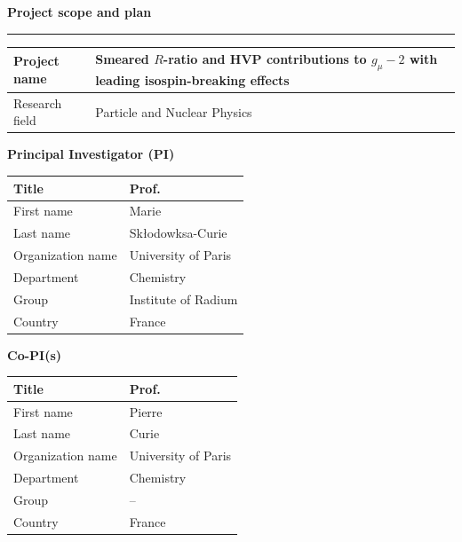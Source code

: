 \documentclass[a4paper,12pt]{article}
\begin{document}
{\fontsize{20}{24} \selectfont\textbf{Project scope and plan}}
{\color{orng}\hrule height 1pt}

\vspace*{0.15in}

\begin{xltabular}{\linewidth}{|>{}l|>{}X|}
  \hline
  \textbf{Project name} & Smeared $R$-ratio and HVP contributions to $g_\mu\!\!-2$ with leading isospin-breaking effects \\
  \hline
  Research field  & Particle and Nuclear Physics\\
  \hline
\end{xltabular}

\vspace{4pt}

\textbf{Principal Investigator (PI)}
\begin{xltabular}{\linewidth}{|>{}l|>{}X|}
  \hline
  Title & Prof. \\
  \hline
  First name  & Marie  \\
  \hline
  Last name  & Sk{\l}odowksa-Curie \\
  \hline
  Organization name  &  University of Paris \\
  \hline
  Department  & Chemistry \\
  \hline
  Group  &  Institute of Radium \\
  \hline
  Country  & France \\
  \hline
\end{xltabular}

\textbf{Co-PI(s)}
\begin{xltabular}{\linewidth}{|>{}l|>{}X|}
  \hline
  Title & Prof. \\
  \hline
  First name  & Pierre  \\
  \hline
  Last name  & Curie \\
  \hline
  Organization name  & University of Paris \\
  \hline
  Department  &  Chemistry \\
  \hline
  Group  &  -- \\
  \hline
  Country  & France \\
  \hline
\end{xltabular}

\vspace{4cm}

\setcounter{page}{1}

\clearpage
\end{document}
